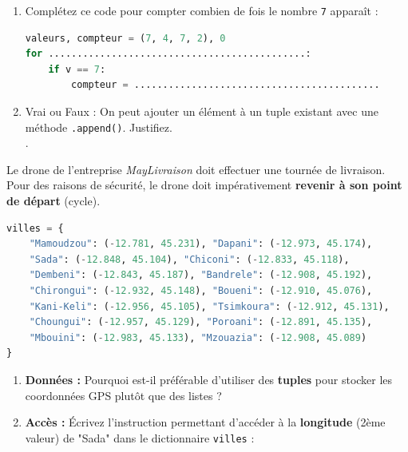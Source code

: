 \begin{Exercise}[title={Maîtrise des Tuples : Les fondamentaux }]
\begin{enumerate}
    \item  Complétez ce code pour compter combien de fois le nombre \texttt{7} apparaît :
    \begin{lstlisting}[style=pythonstyle, language=Python]
valeurs, compteur = (7, 4, 7, 2), 0
for .............................................:
    if v == 7:
        compteur = ...........................................
\end{lstlisting}

    \item  Vrai ou Faux : On peut ajouter un élément à un tuple existant avec une méthode \texttt{.append()}. Justifiez.\\ 
    .\dotfill
\end{enumerate}
\end{Exercise}

\begin{Exercise}[title={Mission MayLivraison : Le défi du Drone }]
Le drone de l'entreprise \textit{MayLivraison} doit effectuer une tournée de livraison. Pour des raisons de sécurité, le drone doit impérativement \textbf{revenir à son point de départ} (cycle).

\begin{lstlisting}[style=pythonstyle, language=Python]
villes = {
    "Mamoudzou": (-12.781, 45.231), "Dapani": (-12.973, 45.174),
    "Sada": (-12.848, 45.104), "Chiconi": (-12.833, 45.118),
    "Dembeni": (-12.843, 45.187), "Bandrele": (-12.908, 45.192),
    "Chirongui": (-12.932, 45.148), "Boueni": (-12.910, 45.076),
    "Kani-Keli": (-12.956, 45.105), "Tsimkoura": (-12.912, 45.131),
    "Choungui": (-12.957, 45.129), "Poroani": (-12.891, 45.135),
    "Mbouini": (-12.983, 45.133), "Mzouazia": (-12.908, 45.089)
}
\end{lstlisting}

\begin{enumerate}
    \item  \textbf{Données :} Pourquoi est-il préférable d'utiliser des \textbf{tuples} pour stocker les coordonnées GPS plutôt que des listes ? \dotfill
    
    \item  \textbf{Accès :} Écrivez l'instruction permettant d'accéder à la \textbf{longitude} (2ème valeur) de "Sada" dans le dictionnaire \texttt{villes} : \dotfill
    

\end{enumerate}
\end{Exercise}
